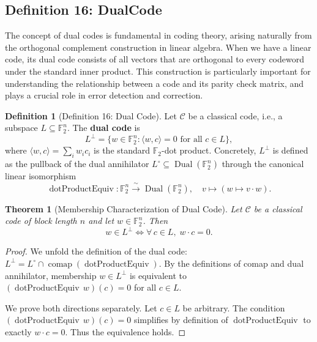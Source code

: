\documentclass[11pt]{article}
\theoremstyle{plain}
\newtheorem*{theorem}{Theorem}
\theoremstyle{definition}
\newtheorem*{definition}{Definition}
\theoremstyle{remark}
\begin{document}
\vspace{1em}

\subsection{Definition 16: DualCode}

The concept of dual codes is fundamental in coding theory, arising naturally from the orthogonal complement construction in linear algebra. When we have a linear code, its dual code consists of all vectors that are orthogonal to every codeword under the standard inner product. This construction is particularly important for understanding the relationship between a code and its parity check matrix, and plays a crucial role in error detection and correction.

\begin{definition}[Definition 16: Dual Code]
Let $\mathcal{C}$ be a classical code, i.e., a subspace $L \subseteq \mathbb{F}_2^n$. The \textbf{dual code} is
\[
L^\perp = \{ w \in \mathbb{F}_2^n : \langle w, c \rangle = 0 \text{ for all } c \in L \},
\]
where $\langle w, c \rangle = \sum_i w_i c_i$ is the standard $\mathbb{F}_2$-dot product. Concretely, $L^\perp$ is defined as the pullback of the dual annihilator $L^{\circ} \subseteq \operatorname{Dual}(\mathbb{F}_2^n)$ through the canonical linear isomorphism
\[
\operatorname{dotProductEquiv} : \mathbb{F}_2^n \xrightarrow{\;\sim\;} \operatorname{Dual}(\mathbb{F}_2^n), \quad v \mapsto (w \mapsto v \cdot w).
\]
\end{definition}

\begin{theorem}[Membership Characterization of Dual Code]
Let $\mathcal{C}$ be a classical code of block length $n$ and let $w \in \mathbb{F}_2^n$. Then
\[
w \in L^\perp \iff \forall\, c \in L,\; w \cdot c = 0.
\]
\end{theorem}

\begin{proof}
We unfold the definition of the dual code: $L^\perp = L^{\circ} \cap \operatorname{comap}(\operatorname{dotProductEquiv})$. By the definitions of comap and dual annihilator, membership $w \in L^\perp$ is equivalent to $(\operatorname{dotProductEquiv}\, w)(c) = 0$ for all $c \in L$. 

We prove both directions separately. Let $c \in L$ be arbitrary. The condition $(\operatorname{dotProductEquiv}\, w)(c) = 0$ simplifies by definition of $\operatorname{dotProductEquiv}$ to exactly $w \cdot c = 0$. Thus the equivalence holds.
\end{proof}
\end{document}
